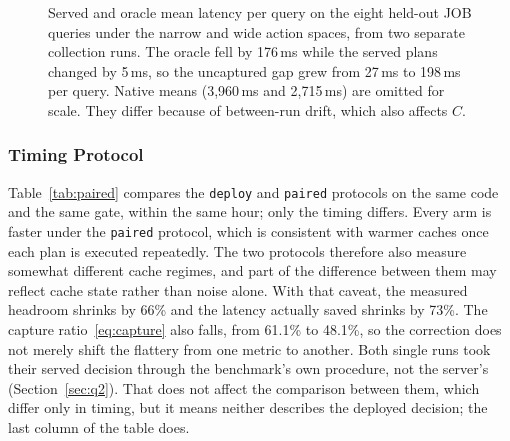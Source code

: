 \documentclass[conference]{IEEEtran}
\begin{document}
\begin{figure}[t]
\centering
{}
\caption{Served and oracle mean latency per query on the eight held-out JOB
queries under the narrow and wide action spaces, from two separate collection
runs. The oracle fell by 176\,ms while the served plans changed by 5\,ms, so
the uncaptured gap grew from 27\,ms to 198\,ms per query. Native means
(3,960\,ms and 2,715\,ms) are omitted for scale. They differ because of
between-run drift, which also affects $C$.}
\label{fig:job}
\end{figure}

\subsubsection{Timing Protocol}
Table~\ref{tab:paired} compares the \texttt{deploy} and
\texttt{paired} protocols on the same code and the same gate, within the same
hour; only the timing differs. Every arm is faster under the \texttt{paired}
protocol, which is consistent with warmer caches once each plan is executed
repeatedly. The two protocols therefore also measure somewhat different cache
regimes, and part of the difference between them may reflect cache state
rather than noise alone. With that caveat, the measured headroom shrinks by
66\% and the latency actually saved shrinks by 73\%. The capture
ratio~\eqref{eq:capture} also falls, from 61.1\% to 48.1\%, so the correction
does not merely shift the flattery from one metric to another. Both single runs
took their served decision through the benchmark's own procedure, not the
server's (Section~\ref{sec:q2}). That does not affect the comparison between
them, which differ only in timing, but it means neither describes the deployed
decision; the last column of the table does.
\end{document}
